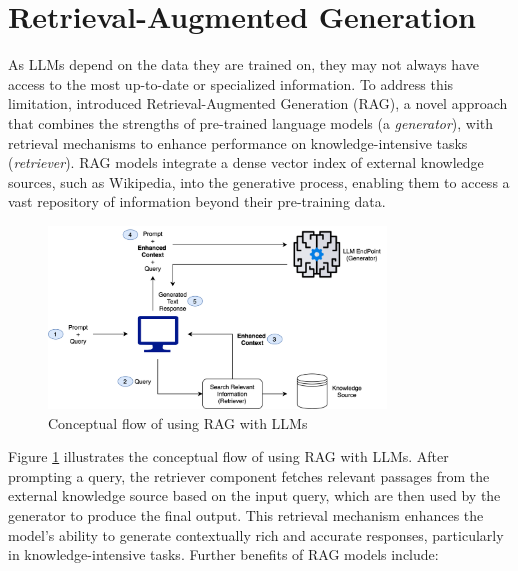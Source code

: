 \section{Retrieval-Augmented Generation}
As LLMs depend on the data they are trained on, they may not always have access to the most up-to-date or specialized information. To address this limitation, \cite{lewis2020RAG} introduced Retrieval-Augmented Generation (RAG), a novel approach that combines the strengths of pre-trained language models (a \emph{generator}), with retrieval mechanisms to enhance performance on knowledge-intensive tasks (\emph{retriever}). RAG models integrate a dense vector index of external knowledge sources, such as Wikipedia, into the generative process, enabling them to access a vast repository of information beyond their pre-training data.
\begin{figure}[H]
    \centering
    \includegraphics[width=0.8\textwidth]{figs/Flowdiagram.png}
    \caption{Conceptual flow of using RAG with LLMs}
    \label{fig:rag_architecture}
\end{figure}
Figure \ref{fig:rag_architecture} illustrates the conceptual flow of using RAG with LLMs. After prompting a query, the retriever component fetches relevant passages from the external knowledge source based on the input query, which are then used by the generator to produce the final output. This retrieval mechanism enhances the model's ability to generate contextually rich and accurate responses, particularly in knowledge-intensive tasks.
Further benefits of RAG models include:
